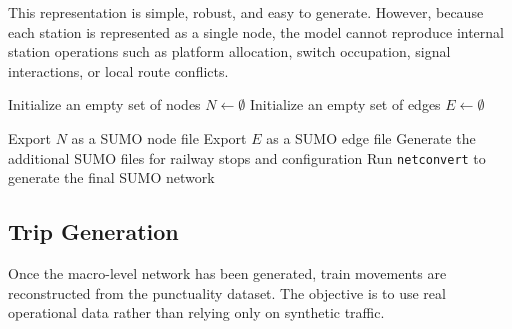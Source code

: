 This representation is simple, robust, and easy to generate. However, because each station is represented as a single node, 
the model cannot reproduce internal station operations such as platform allocation, switch occupation, signal interactions, 
or local route conflicts.

\begin{algorithm}[h]
\caption{Macro-level railway network generation}\label{alg:macro-network-generation}



Initialize an empty set of nodes $N \gets \emptyset$\;
Initialize an empty set of edges $E \gets \emptyset$\;



Export $N$ as a SUMO node file\;
Export $E$ as a SUMO edge file\;
Generate the additional SUMO files for railway stops and configuration\;
Run \texttt{netconvert} to generate the final SUMO network\;

\;

\end{algorithm}


\subsection{Trip Generation}
Once the macro-level network has been generated, train movements are reconstructed from the punctuality dataset. 
The objective is to use real operational data rather than relying only on synthetic traffic.

